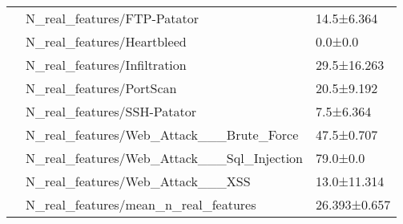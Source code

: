 \begin{tabular}{lll}
     & N\_real\_features/FTP-Patator &    14.5±6.364 \\
     & N\_real\_features/Heartbleed &       0.0±0.0 \\
     & N\_real\_features/Infiltration &   29.5±16.263 \\
     & N\_real\_features/PortScan &    20.5±9.192 \\
     & N\_real\_features/SSH-Patator &     7.5±6.364 \\
     & N\_real\_features/Web\_Attack\_\_\_Brute\_Force &    47.5±0.707 \\
     & N\_real\_features/Web\_Attack\_\_\_Sql\_Injection &      79.0±0.0 \\
     & N\_real\_features/Web\_Attack\_\_\_XSS &   13.0±11.314 \\
     & N\_real\_features/mean\_n\_real\_features &  26.393±0.657 \\
\bottomrule
\end{tabular}
